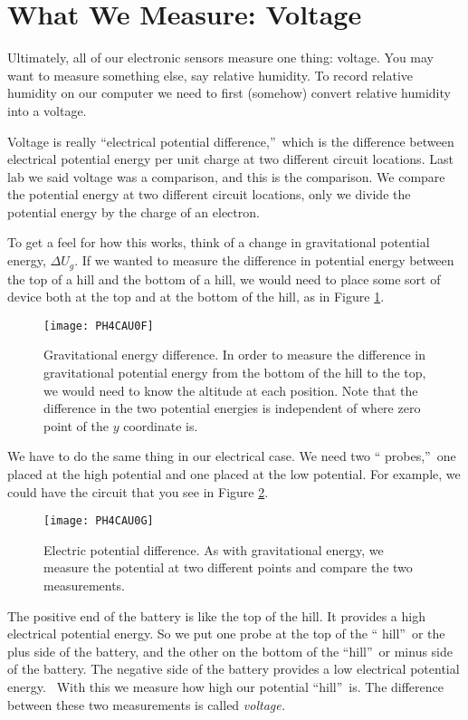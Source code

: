 \section{What We Measure: Voltage
\label{Voltage Measurement
with Meter}}

Ultimately, all of our electronic sensors measure one thing: voltage. 
You may want to measure something else, say relative humidity.
To record relative humidity on our computer we need to first
(somehow) convert relative humidity into a voltage. 

Voltage is really \textquotedblleft electrical potential
difference,\textquotedblright\ which is the difference between electrical
potential energy per unit charge at two different circuit locations. Last
lab we said voltage was a comparison, and this is the comparison. We compare
the potential energy at two different circuit locations, only we divide the
potential energy by the charge of an electron.

To get a feel for how this works, think of a change in gravitational
potential energy, $\Delta U_{g}$. If we wanted to measure the difference in
potential energy between the top of a hill and the bottom of a hill, we
would need to place some sort of device both at the top and at the bottom of
the hill, as in Figure \ref{fig:grav_energy}.
\begin{figure}[htbp!]
\centering
\texttt{[image: PH4CAU0F]}
\caption[Gravitational energy difference]{Gravitational energy
difference. In order to measure the difference in gravitational potential 
energy from the bottom of the hill to the top, we would need to know the
altitude at each position. Note that the difference in the two potential
energies is independent of where zero point of the $y$ coordinate is.}
\label{fig:grav_energy}
\end{figure}

We have to do the same thing in
our electrical case. We need two \textquotedblleft
probes,\textquotedblright\ one placed at the high potential and one placed
at the low potential. For example, we could have the circuit that you see in
Figure \ref{fig:basic_circuit_voltmeter}.
\begin{figure}[hbp!]
\centering
\texttt{[image: PH4CAU0G]}
\caption[Electric potential difference]{Electric potential difference.
As with gravitational energy, we measure the potential at two different points
and compare the two measurements.}
\label{fig:basic_circuit_voltmeter}
\end{figure}
The positive end of the battery
is like the top of the hill. It provides a high electrical potential energy.
So we put one probe at the top of the \textquotedblleft
hill\textquotedblright\ or the plus side of the battery, and the other on
the bottom of the \textquotedblleft hill\textquotedblright\ or minus side of
the battery. The negative side of the battery provides a low electrical
potential energy. \emph{\ }With this we measure how high our potential
\textquotedblleft hill\textquotedblright\ is. The difference between these
two measurements is called \emph{voltage. } 

